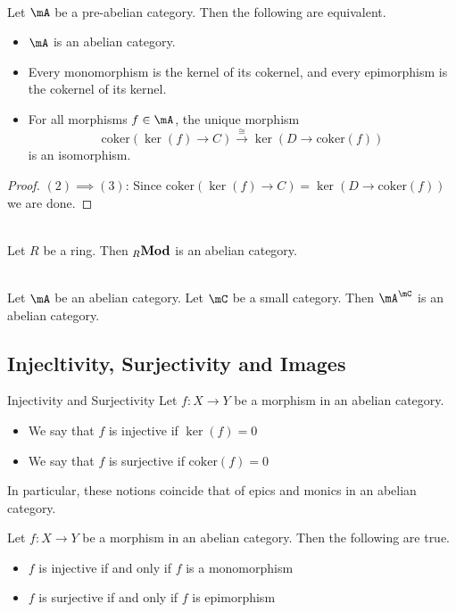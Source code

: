 \documentclass[a4paper]{article}
\begin{document}
\begin{lmm}{}{}\\
Let $\mA$ be a pre-abelian category. Then the following are equivalent. 
\begin{itemize}
\item $\mA$ is an abelian category. 
\item Every monomorphism is the kernel of its cokernel, and every epimorphism is the cokernel of its kernel. 
\item For all morphisms $f\in\mA$, the unique morphism $$\text{coker}(\ker(f)\to C)\overset{\cong}{\to}\ker(D\to\text{coker}(f))$$ is an isomorphism. 
\end{itemize}
\begin{proof}
$(2)\implies(3)$: Since $\text{coker}(\ker(f)\to C)=\ker(D\to\text{coker}(f))$ we are done. 
\end{proof}
\end{lmm}

\begin{eg}{}{}\\
Let $R$ be a ring. Then ${_R}\bold{Mod}$ is an abelian category. 
\end{eg}

\begin{prp}{}{}\\
Let $\mA$ be an abelian category. Let $\mC$ be a small category. Then $\mA^\mC$ is an abelian category. 
\end{prp}

\subsection{Injecltivity, Surjectivity and Images}
\begin{defn}{Injectivity and Surjectivity}{} Let $f:X\to Y$ be a morphism in an abelian category. 
\begin{itemize}
\item We say that $f$ is injective if $\ker(f)=0$
\item We say that $f$ is surjective if $\text{coker}(f)=0$
\end{itemize}
\end{defn}

In particular, these notions coincide that of epics and monics in an abelian category. 

\begin{prp}{}{} Let $f:X\to Y$ be a morphism in an abelian category. Then the following are true. 
\begin{itemize}
\item $f$ is injective if and only if $f$ is a monomorphism
\item $f$ is surjective if and only if $f$ is epimorphism
\end{itemize}
\end{prp}
\end{document}
